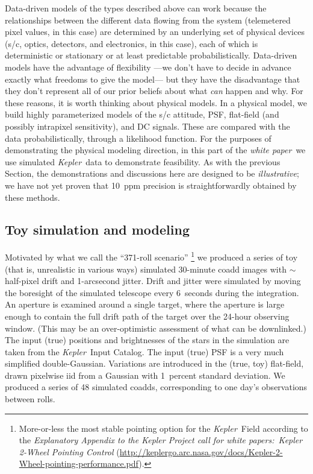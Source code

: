 \documentclass[letterpaper,12pt,whitepaper]{haastex}
\newcommand{\sectionname}{Section}
\newcommand{\documentname}{\textsl{white paper}}
\newcommand{\observatory}[1]{\textsl{#1}}
\newcommand{\Kepler}{\observatory{Kepler}}
\begin{document}
Data-driven models of the types described above can work
  because the relationships between the different data flowing from the system
  (telemetered pixel values, in this case)
  are determined by an underlying set of physical devices
  (s/c, optics, detectors, and electronics, in this case),
  each of which is deterministic or stationary or at least predictable probabilistically.
Data-driven models have the advantage of flexibility%
  ---we don't have to decide in advance exactly what freedoms to give the model---%
  but they have the disadvantage that they don't represent all of our prior beliefs
  about what \emph{can} happen and why.
For these reasons, it is worth thinking about physical models.
In a physical model, we build highly parameterized models
  of the s/c attitude, PSF, flat-field (and possibly intrapixel sensitivity),
  and DC signals.
These are compared with the data probabilistically,
  through a likelihood function.
For the purposes of demonstrating the physical modeling direction,
  in this part of the \documentname\, we use simulated \Kepler\ data
  to demonstrate feasibility.
As with the previous \sectionname, the demonstrations and discussions here are designed
  to be \emph{illustrative};
  we have not yet proven that 10~ppm precision is straightforwardly obtained by these methods.

\subsection{Toy simulation and modeling}\label{sec:toys}

Motivated by what we call the ``371-roll scenario''%
  \footnote{More-or-less the most stable pointing option for the \Kepler~Field according to
    the \textit{Explanatory Appendix to the Kepler Project
      call for white papers:\ Kepler 2-Wheel Pointing Control}
    (\url{http://keplergo.arc.nasa.gov/docs/Kepler-2-Wheel-pointing-performance.pdf}).}
  we produced a series of toy (that is, unrealistic in various ways)
  simulated 30-minute coadd images with $\sim$ half-pixel drift and 1-arcsecond jitter.
Drift and jitter were simulated by moving the boresight of the simulated telescope
  every 6~seconds during the integration.
An aperture is examined around a single target,
  where the aperture is large enough to contain the full drift path
  of the target over the 24-hour observing window.
(This may be an over-optimistic assessment of what can be downlinked.)
The input (true) positions and brightnesses of the stars in the simulation are
  taken from the \Kepler\ Input Catalog.
The input (true) PSF is a very much simplified double-Gaussian.
Variations are introduced in the (true, toy) flat-field,
   drawn pixelwise iid from a Gaussian with 1~percent standard deviation.
We produced a series of 48 simulated coadds,
   corresponding to one day's observations between rolls.
\end{document}
